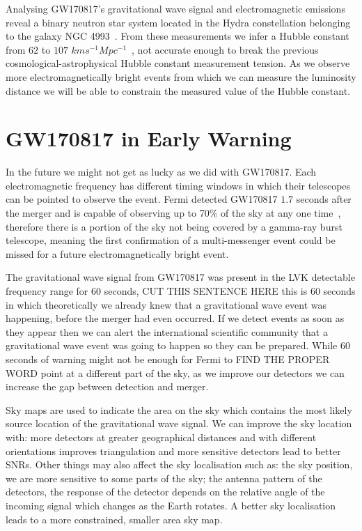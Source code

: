 Analysing GW170817's gravitational wave signal and electromagnetic emissions reveal a binary neutron star system located in the Hydra constellation belonging to the galaxy NGC 4993~\cite{}. From these measurements we infer a Hubble constant from $62$ to $107$ $km s^{-1} Mpc^{-1}$~\cite{}, not accurate enough to break the previous cosmological-astrophysical Hubble constant measurement tension. As we observe more electromagnetically bright events from which we can measure the luminosity distance we will be able to constrain the measured value of the Hubble constant.

\section{GW170817 in Early Warning}

In the future we might not get as lucky as we did with GW170817. Each electromagnetic frequency has different timing windows in which their telescopes can be pointed to observe the event. Fermi detected GW170817 $1.7$ seconds after the merger and is capable of observing up to 70\% of the sky at any one time~\cite{}, therefore there is a portion of the sky not being covered by a gamma-ray burst telescope, meaning the first confirmation of a multi-messenger event could be missed for a future electromagnetically bright event.

The gravitational wave signal from GW170817 was present in the LVK detectable frequency range for $60$ seconds, CUT THIS SENTENCE HERE this is $60$ seconds in which theoretically we already knew that a gravitational wave event was happening, before the merger had even occurred. If we detect events as soon as they appear then we can alert the international scientific community that a gravitational wave event was going to happen so they can be prepared. While $60$ seconds of warning might not be enough for Fermi to FIND THE PROPER WORD point at a different part of the sky, as we improve our detectors we can increase the gap between detection and merger.

Sky maps are used to indicate the area on the sky which contains the most likely source location of the gravitational wave signal. We can improve the sky location with: more detectors at greater geographical distances and with different orientations improves triangulation and more sensitive detectors lead to better SNRs. Other things may also affect the sky localisation such as: the sky position, we are more sensitive to some parts of the sky; the antenna pattern of the detectors, the response of the detector depends on the relative angle of the incoming signal which changes as the Earth rotates. A better sky localisation leads to a more constrained, smaller area sky map.

